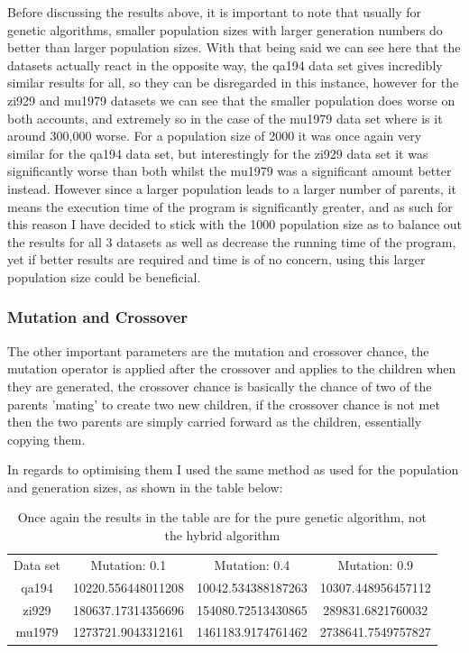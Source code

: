 \documentclass[11pt,a4paper,titlepage]{article}
\begin{document}
Before discussing the results above, it is important to note that usually for genetic algorithms, smaller population sizes with larger generation numbers do better than larger population sizes. With that being said we can see here that the datasets actually react in the opposite way, the qa194 data set gives incredibly similar results for all, so they can be disregarded in this instance, however for the zi929 and mu1979 datasets we can see that the smaller population does worse on both accounts, and extremely so in the case of the mu1979 data set where is it around 300,000 worse. For a population size of 2000 it was once again very similar for the qa194 data set, but interestingly for the zi929 data set it was significantly worse than both whilst the mu1979 was a significant amount better instead. However since a larger population leads to a larger number of parents, it means the execution time of the program is significantly greater, and as such for this reason I have decided to stick with the 1000 population size as to balance out the results for all 3 datasets as well as decrease the running time of the program, yet if better results are required and time is of no concern, using this larger population size could be beneficial.

\subsubsection{Mutation and Crossover}

The other important parameters are the mutation and crossover chance, the mutation operator is applied after the crossover and applies to the children when they are generated, the crossover chance is basically the chance of two of the parents 'mating' to create two new children, if the crossover chance is not met then the two parents are simply carried forward as the children, essentially copying them.

\pagebreak

In regards to optimising them I used the same method as used for the population and generation sizes, as shown in the table below:

\begin{table}[h]
\centering
\begin{tabular}{c | c | c | c}
Data set & Mutation: 0.1 & Mutation: 0.4 & Mutation: 0.9 \\ [0.5ex]
\Xhline{1.5pt}
	qa194 & 10220.556448011208 & 10042.534388187263 & 10307.448956457112 \\
\hline
	zi929 & 180637.17314356696 & 154080.72513430865 & 289831.6821760032 \\
\hline
	mu1979 & 1273721.9043312161 & 1461183.9174761462 & 2738641.7549757827

\end{tabular}
\caption{Once again the results in the table are for the pure genetic algorithm, not the hybrid algorithm}
\end{table}
\end{document}
